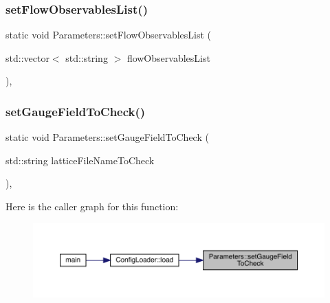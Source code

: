 \subsubsection{\texorpdfstring{setFlowObservablesList()}{setFlowObservablesList()}}
{\footnotesize\ttfamily static void Parameters\+::set\+Flow\+Observables\+List (\begin{DoxyParamCaption}\item[{std\+::vector$<$ std\+::string $>$}]{flow\+Observables\+List }\end{DoxyParamCaption})\hspace{0.3cm}{\ttfamily [inline]}, {\ttfamily [static]}}

\mbox{\label{class_parameters_afba800600f057fa6ed8fb317add0af30}} 
\subsubsection{\texorpdfstring{setGaugeFieldToCheck()}{setGaugeFieldToCheck()}}
{\footnotesize\ttfamily static void Parameters\+::set\+Gauge\+Field\+To\+Check (\begin{DoxyParamCaption}\item[{std\+::string}]{lattice\+File\+Name\+To\+Check }\end{DoxyParamCaption})\hspace{0.3cm}{\ttfamily [inline]}, {\ttfamily [static]}}

Here is the caller graph for this function\+:\nopagebreak
\begin{figure}[H]
\begin{center}
\leavevmode
\includegraphics[width=350pt]{class_parameters_afba800600f057fa6ed8fb317add0af30_icgraph}
\end{center}
\end{figure}
\mbox{\label{class_parameters_af4a107cdc7b6400685fdcbd33983a16f}} 
